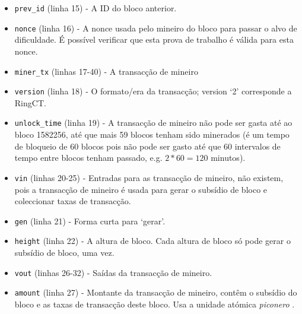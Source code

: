 \begin{itemize}
    \item {\tt prev\_id} (linha 15) - A ID do bloco anterior.
    \item {\tt nonce} (linha 16) - A nonce usada pelo mineiro do bloco para passar o alvo de dificuldade. É possível verificar que esta prova de trabalho é válida para esta nonce.  
    \item {\tt miner\_tx} (linhas 17-40) - A transacção de mineiro
    \item {\tt version} (linha 18) - O formato/era da transacção; version `2' corresponde a RingCT.
    \item {\tt unlock\_time} (linha 19) - A transacção de mineiro não pode ser gasta até ao bloco 1582256, até que mais 59 blocos tenham sido minerados (é um tempo de bloqueio de 60 blocos pois não pode ser gasto até que 60 intervalos de tempo entre blocos tenham passado, e.g. $2*60 = 120$ minutos).
    \item {\tt vin} (linhas 20-25) - Entradas para as transacção de mineiro, não existem, pois a transacção de mineiro é usada para gerar o subsídio de bloco e coleccionar taxas de transacção.
    \item {\tt gen} (linha 21) - Forma curta para `gerar'.
    \item {\tt height} (linha 22) - A altura de bloco. Cada altura de bloco só pode gerar o subsídio de bloco, uma vez.
    \item {\tt vout} (linhas 26-32) - Saídas da transacção de mineiro.
    \item {\tt amount} (linha 27) - Montante da transacção de mineiro, contêm o subsídio do bloco e as taxas de transacção deste bloco. Usa a unidade atómica {\em piconero} . 

\end{itemize}
